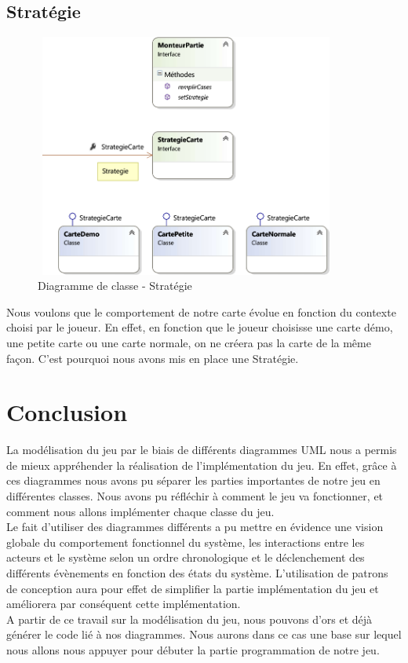 \documentclass[a4paper,11pt]{article}
\begin{document}
	\subsection{Stratégie}
	\begin{figure}[ht!]
		\includegraphics[height=8cm,width=10cm]{Diagrammes/Classe/strategie.png}
		\caption{Diagramme de classe - Stratégie}
		\label{fig:strategie}
	\end{figure}
	\vspace*{1cm}
Nous voulons que le comportement de notre carte évolue en fonction du contexte choisi par le joueur. En effet, en fonction que le joueur choisisse une carte démo, une petite carte ou une carte normale, on ne créera pas la carte de la même façon. C’est pourquoi nous avons mis en place une Stratégie.

	\newpage

\section*{Conclusion}
	La modélisation du jeu par le biais de différents diagrammes UML nous a permis de mieux appréhender la réalisation de l’implémentation du jeu. En effet, grâce à ces diagrammes nous avons pu séparer les parties importantes de notre jeu en différentes classes. Nous avons pu réfléchir à comment le jeu va fonctionner, et comment nous allons implémenter chaque classe du jeu.\\
	
Le fait d’utiliser des diagrammes différents a pu mettre en évidence une vision globale du comportement fonctionnel du système, les interactions entre les acteurs et le système selon un ordre chronologique et le déclenchement des différents évènements en fonction des états du système. L’utilisation de patrons de conception aura pour effet de simplifier la partie implémentation du jeu et améliorera par conséquent cette implémentation.\\

A partir de ce travail sur la modélisation du jeu, nous pouvons d’ors et déjà générer le code lié à nos diagrammes. Nous aurons dans ce cas une base sur lequel nous allons nous appuyer pour débuter la partie programmation de notre jeu.

	\newpage
	\listoffigures
\end{document}
